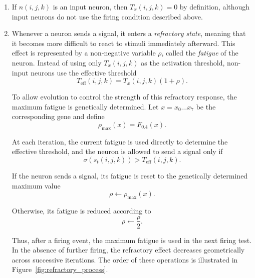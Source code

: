 \documentclass[12pt,a4paper]{article}
\begin{document}
\begin{enumerate}
	
	\item If $n(i, j, k)$ is an input neuron, then $T_x(i, j, k) = 0$ by definition, although input neurons do not use the firing condition described above.
	
	\item Whenever a neuron sends a signal, it enters a \emph{refractory state}, meaning that it becomes more difficult to react to stimuli immediately afterward. This effect is represented by a non-negative variable $\rho$, called the \emph{fatigue} of the neuron. Instead of using only $T_x(i,j,k)$ as the activation threshold, non-input neurons use the effective threshold
	$$T_{\mathrm{eff}}(i,j,k)=T_x(i,j,k)\left(1+\rho\right).$$

	To allow evolution to control the strength of this refractory response, the maximum fatigue is genetically determined. Let $x=x_0\ldots x_7$ be the corresponding gene and define
	$$\rho_{\max}(x)=F_{0.4}(x).	$$

	At each iteration, the current fatigue is used directly to determine the effective threshold, and the neuron is allowed to send a signal only if
	$$\sigma(s_t(i,j,k)) > T_{\mathrm{eff}}(i,j,k).$$

	If the neuron sends a signal, its fatigue is reset to the genetically determined maximum value 
	$$\rho \leftarrow \rho_{\max}(x).$$

	Otherwise, its fatigue is reduced according to
	$$\rho \leftarrow \frac{\rho}{2}.$$

	Thus, after a firing event, the maximum fatigue is used in the next firing test. In the absence of further firing, the refractory effect decreases geometrically across successive iterations. The order of these operations is illustrated in Figure~\ref{fig:refractory_process}.

	\begin{figure}[H]
		\centering
\end{figure}
\end{enumerate}
\end{document}
